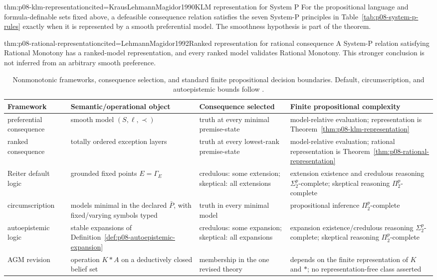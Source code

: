 \begin{hbtheorem}{thm:p08-klm-representation}{cited=KrausLehmannMagidor1990}{KLM representation for System P}
For the propositional language and formula-definable sets fixed above, a
defeasible consequence relation satisfies the seven System-P principles in
Table~\ref{tab:p08-system-p-rules} exactly when it is represented by a smooth
preferential model.  The smoothness hypothesis is part of the theorem.
\end{hbtheorem}

\begin{hbtheorem}{thm:p08-rational-representation}{cited=LehmannMagidor1992}{Ranked representation for rational consequence}
A System-P relation satisfying Rational Monotony has a ranked-model
representation, and every ranked model validates Rational Monotony.  This
stronger conclusion is not inferred from an arbitrary smooth preference.
\end{hbtheorem}

\begin{table}[htbp]
\centering
\scriptsize
\begin{tabularx}{\textwidth}{@{}l X X X@{}}
\toprule
Framework & Semantic/operational object & Consequence selected & Finite propositional complexity \\
\midrule
preferential consequence & smooth model
\((S,\ell,\prec)\) & truth at every minimal premise-state & model-relative evaluation; representation is Theorem~\ref{thm:p08-klm-representation} \\
ranked consequence & totally ordered exception layers & truth at every lowest-rank premise-state & model-relative evaluation; rational representation is Theorem~\ref{thm:p08-rational-representation} \\
Reiter default logic & grounded fixed points \(E=\Gamma_E\) & credulous: some extension; skeptical: all extensions & extension existence and credulous reasoning \(\Sigma_2^p\)-complete; skeptical reasoning \(\Pi_2^p\)-complete \\
circumscription & models minimal in the declared \(\bar P\), with fixed/varying symbols typed & truth in every minimal model & propositional inference \(\Pi_2^p\)-complete \\
autoepistemic logic & stable expansions of Definition~\ref{def:p08-autoepistemic-expansion} & credulous: some expansion; skeptical: all expansions & expansion existence/credulous reasoning \(\Sigma_2^p\)-complete; skeptical reasoning \(\Pi_2^p\)-complete \\
AGM revision & operation \(K*A\) on a deductively closed belief set & membership in the one revised theory & depends on the finite representation of \(K\) and \(*\); no representation-free class asserted \\
\bottomrule
\end{tabularx}
\caption{Nonmonotonic frameworks, consequence selection, and standard finite
propositional decision boundaries.  Default, circumscription, and
autoepistemic bounds follow \textcite{Gottlob1992}.}
\label{tab:p08-nonmonotonic-properties}
\end{table}

